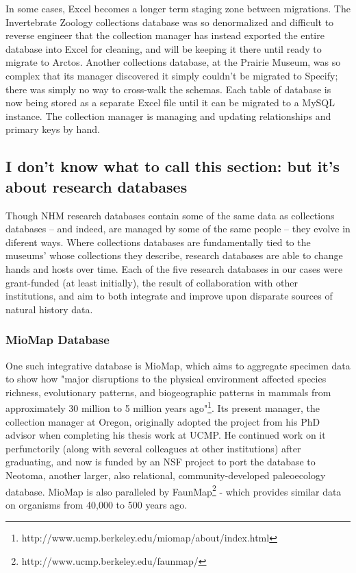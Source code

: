 In some cases, Excel becomes a longer term staging zone between migrations. The Invertebrate Zoology collections database was so denormalized and difficult to reverse engineer that the collection manager has instead exported the entire database into Excel for cleaning, and will be keeping it there until ready to migrate to Arctos. Another collections database, at the Prairie Museum, was so complex that its manager discovered it simply couldn't be migrated to Specify; there was simply no way to cross-walk the schemas. Each table of database is now being stored as a separate Excel file until it can be migrated to a MySQL instance. The collection manager is managing and updating relationships and primary keys by hand. 

\subsection{I don't know what to call this section: but it's about research databases} 

Though NHM research databases contain some of the same data as collections databases -- and indeed, are managed by some of the same people -- they evolve in diferent ways. Where collections databases are fundamentally tied to the museums' whose collections they describe, research databases are able to change hands and hosts over time. Each of the five research databases in our cases were grant-funded (at least initially), the result of collaboration with other institutions, and aim to both integrate and improve upon disparate sources of natural history data. 

\subsubsection{MioMap Database}
One such integrative database is MioMap, which aims to aggregate specimen data to show how "major disruptions to the physical environment affected species richness, evolutionary patterns, and biogeographic patterns in mammals from approximately 30 million to 5 million years ago"\footnote{http://www.ucmp.berkeley.edu/miomap/about/index.html}. Its present manager, the collection manager at Oregon, originally adopted the project from his PhD advisor when completing his thesis work at UCMP. He continued work on it perfunctorily (along with several colleagues at other institutions) after graduating, and now is funded by an NSF project to port the database to Neotoma, another larger, also relational, community-developed paleoecology database. MioMap is also paralleled by FaunMap\footnote{http://www.ucmp.berkeley.edu/faunmap/} - which provides similar data on organisms from 40,000 to 500 years ago.


